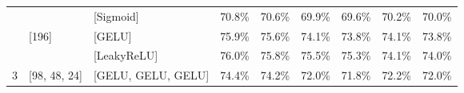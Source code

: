 \begin{table}[!h]
\begin{tabular}{|l|l|l|ll|ll|ll|}
		&                                                                                                   & [Sigmoid]                                                                                           & \multicolumn{1}{l|}{70.8\%}                                                   & 70.6\%                                                         & \multicolumn{1}{l|}{69.9\%}                                                   & 69.6\%                                                         & \multicolumn{1}{l|}{70.2\%}                                                   & 70.0\%                                                         \\ \cline{2-9} 
		& \multirow{2}{*}{[196]}                                                                            & [GELU]                                                                                              & \multicolumn{1}{l|}{75.9\%}                                                   & 75.6\%                                                         & \multicolumn{1}{l|}{74.1\%}                                                   & 73.8\%                                                         & \multicolumn{1}{l|}{74.1\%}                                                   & 73.8\%                                                         \\ \cline{3-9} 
		&                                                                                                   & [LeakyReLU]                                                                                         & \multicolumn{1}{l|}{76.0\%}                                                   & 75.8\%                                                         & \multicolumn{1}{l|}{75.5\%}                                                   & 75.3\%                                                         & \multicolumn{1}{l|}{74.1\%}                                                   & 74.0\%                                                         \\ \hline
		\multirow{6}{*}{3}     & \multirow{2}{*}{[98, 48, 24]}                                                                     & [GELU, GELU, GELU]                                                                                  & \multicolumn{1}{l|}{74.4\%}                                                   & 74.2\%                                                         & \multicolumn{1}{l|}{72.0\%}                                                   & 71.8\%                                                         & \multicolumn{1}{l|}{72.2\%}                                                   & 72.0\%                                                         \\ \cline{3-9} 

\end{tabular}
\end{table}
